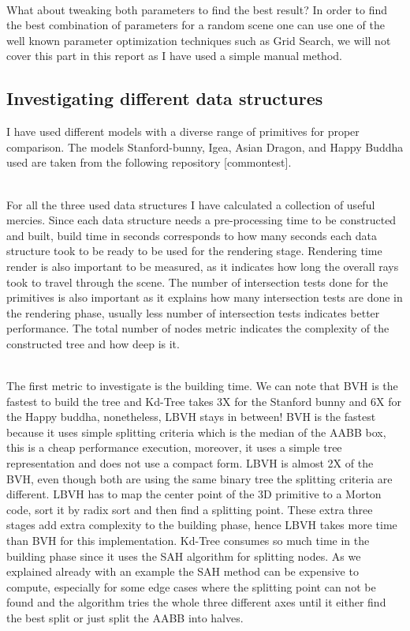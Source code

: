 \documentclass[11pt,a4paper]{article}
\begin{document}
\noindent
\\
What about tweaking both parameters to find the best result? In order to find the best combination of parameters for a random scene one can use one of the well known parameter optimization techniques such as  Grid Search, we will not cover this part in this report as I have used a simple manual method. 

\subsection{Investigating different data structures}
I have used different models with a diverse range of primitives for proper comparison. The models Stanford-bunny, Igea, Asian Dragon, and Happy Buddha used are taken from the following repository [commontest].

\noindent
\\
For all the three used data structures I have calculated a collection of useful mercies.  Since each data structure needs a pre-processing time to be constructed and built, build time in seconds corresponds to how many seconds each data structure took to be ready to be used for the rendering stage. Rendering time render is also important to be measured, as it indicates how long the overall rays took to travel through the scene. The number of intersection tests done for the primitives is also important as it explains how many intersection tests are done in the rendering phase, usually less number of intersection tests indicates better performance. The total number of nodes metric indicates the complexity of the constructed tree and how deep is it. 

\noindent
\\
The first metric to investigate is the building time. We can note that BVH is the fastest to build the tree and Kd-Tree takes 3X for the Stanford bunny and 6X for the Happy buddha, nonetheless, LBVH stays in between! BVH is the fastest because it uses simple splitting criteria which is the median of the AABB box, this is a cheap performance execution, moreover, it uses a simple tree representation and does not use a compact form. LBVH is almost 2X of the BVH, even though both are using the same binary tree the splitting criteria are different. LBVH has to map the center point of the 3D primitive to a Morton code, sort it by radix sort and then find a splitting point. These extra three stages add extra complexity to the building phase, hence LBVH takes more time than BVH for this implementation. Kd-Tree consumes so much time in the building phase since it uses the SAH algorithm for splitting nodes. As we explained already with an example the SAH method can be expensive to compute, especially for some edge cases where the splitting point can not be found and the algorithm tries the whole three different axes until it either find the best split or just split the AABB into halves. 
\end{document}
